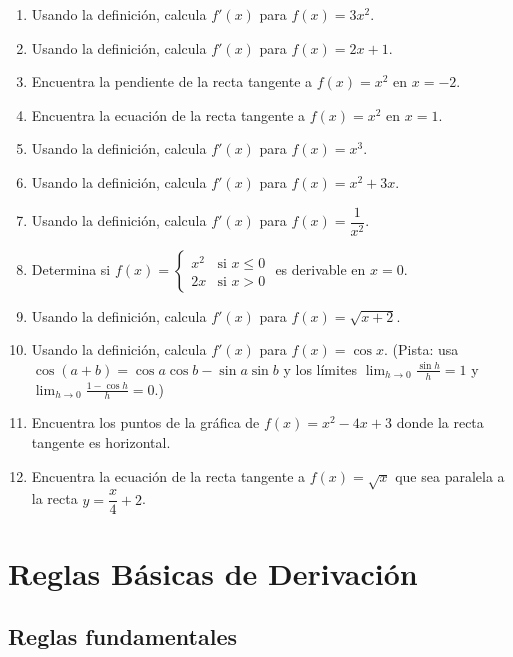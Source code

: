 \documentclass[12pt, letterpaper]{article}
\begin{document}
\begin{enumerate}[series=ejercicios, leftmargin=*]
  \item \facil{} Usando la definición, calcula $f'(x)$ para $f(x) = 3x^2$.
  \item \facil{} Usando la definición, calcula $f'(x)$ para $f(x) = 2x + 1$.
  \item \facil{} Encuentra la pendiente de la recta tangente a $f(x) = x^2$ en $x = -2$.
  \item \facil{} Encuentra la ecuación de la recta tangente a $f(x) = x^2$ en $x = 1$.
  \item \medio{} Usando la definición, calcula $f'(x)$ para $f(x) = x^3$.
  \item \medio{} Usando la definición, calcula $f'(x)$ para $f(x) = x^2 + 3x$.
  \item \medio{} Usando la definición, calcula $f'(x)$ para $f(x) = \dfrac{1}{x^2}$.
  \item \medio{} Determina si $f(x) = \begin{cases} x^2 & \text{si } x \le 0 \\ 2x & \text{si } x > 0 \end{cases}$ es derivable en $x = 0$.
  \item \dificil{} Usando la definición, calcula $f'(x)$ para $f(x) = \sqrt{x + 2}$.
  \item \dificil{} Usando la definición, calcula $f'(x)$ para $f(x) = \cos x$. (Pista: usa $\cos(a + b) = \cos a \cos b - \sin a \sin b$ y los límites $\lim_{h \to 0} \frac{\sin h}{h} = 1$ y $\lim_{h \to 0} \frac{1 - \cos h}{h} = 0$.)
  \item \dificil{} Encuentra los puntos de la gráfica de $f(x) = x^2 - 4x + 3$ donde la recta tangente es horizontal.
  \item \dificil{} Encuentra la ecuación de la recta tangente a $f(x) = \sqrt{x}$ que sea paralela a la recta $y = \dfrac{x}{4} + 2$.
\end{enumerate}

\newpage


\section{Reglas Básicas de Derivación}

\subsection{Reglas fundamentales}
\end{document}
